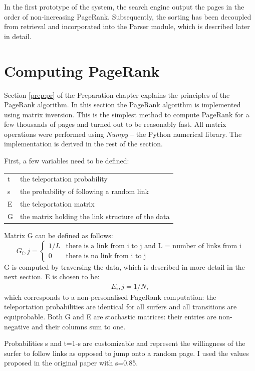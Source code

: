 \documentclass[12pt,notitlepage,twoside]{scrreprt}
\begin{document}
In the first prototype of the system, the search engine output the pages in the order of
non-increasing PageRank. Subsequently, the sorting has been decoupled from retrieval and
incorporated into the Parser module, which is described later in detail.

\section{Computing PageRank} 
\label{impl:pr}

Section \ref{prep:pr} of the Preparation chapter explains the principles of the PageRank
algorithm. In this section the PageRank algorithm is implemented using matrix inversion.
This is the simplest method to compute PageRank for a few thousands of pages and turned
out to be reasonably fast. All matrix operations were performed using \textit{Numpy} --
the Python numerical library. The implementation is derived in the rest of the section.

First, a few variables need to be defined:

\begin{tabular}[h!]{l l}
	t & the teleportation probability \\
	s & the probability of following a random link \\
	E & the teleportation matrix \\
	G & the matrix holding the link structure of the data \\
\end{tabular}

Matrix G can be defined as follows:
\begin{equation*}
  G_i,j = \begin{cases}
    1/L & \text{there is a link from i to j and L = number of links from i}\\
    0   & \text{there is no link from i to j}
  \end{cases}
\end{equation*}
G is computed by traversing the data, which is described in more detail in the next
section. E is chosen to be:
\begin{gather*}
E_i,j = 1/N, 
\end{gather*}
which corresponds to a non-personalised PageRank computation: the teleportation
probabilities are identical for all surfers and all transitions are equiprobable.
Both G and E are stochastic matrices: their entries are non-negative and their columns sum
to one.

Probabilities s and t=1-s are customizable and represent the willingness of the surfer to
follow links as opposed to jump onto a random page. I used the values proposed in the
original paper\cite{pr} with s=0.85.
\end{document}
